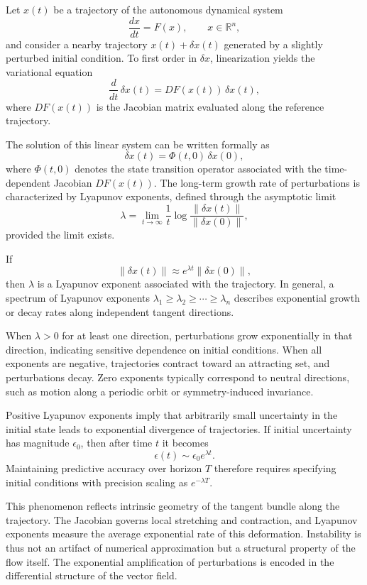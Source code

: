 \documentclass[12pt]{book}
\begin{document}
Let $x(t)$ be a trajectory of the autonomous dynamical system
\[
\frac{dx}{dt} = F(x), 
\qquad x \in \mathbb{R}^n,
\]
and consider a nearby trajectory $x(t) + \delta x(t)$ generated by a slightly perturbed initial condition. To first order in $\delta x$, linearization yields the variational equation
\[
\frac{d}{dt}\,\delta x(t) = DF(x(t))\,\delta x(t),
\]
where $DF(x(t))$ is the Jacobian matrix evaluated along the reference trajectory.

The solution of this linear system can be written formally as
\[
\delta x(t) = \Phi(t,0)\,\delta x(0),
\]
where $\Phi(t,0)$ denotes the state transition operator associated with the time-dependent Jacobian $DF(x(t))$. The long-term growth rate of perturbations is characterized by Lyapunov exponents, defined through the asymptotic limit
\[
\lambda = \lim_{t \to \infty} \frac{1}{t} \log \frac{\|\delta x(t)\|}{\|\delta x(0)\|},
\]
provided the limit exists.

If
\[
\|\delta x(t)\| \approx e^{\lambda t} \|\delta x(0)\|,
\]
then $\lambda$ is a Lyapunov exponent associated with the trajectory. In general, a spectrum of Lyapunov exponents $\lambda_1 \ge \lambda_2 \ge \cdots \ge \lambda_n$ describes exponential growth or decay rates along independent tangent directions.

When $\lambda > 0$ for at least one direction, perturbations grow exponentially in that direction, indicating sensitive dependence on initial conditions. When all exponents are negative, trajectories contract toward an attracting set, and perturbations decay. Zero exponents typically correspond to neutral directions, such as motion along a periodic orbit or symmetry-induced invariance.

Positive Lyapunov exponents imply that arbitrarily small uncertainty in the initial state leads to exponential divergence of trajectories. If initial uncertainty has magnitude $\epsilon_0$, then after time $t$ it becomes
\[
\epsilon(t) \sim \epsilon_0 e^{\lambda t}.
\]
Maintaining predictive accuracy over horizon $T$ therefore requires specifying initial conditions with precision scaling as $e^{-\lambda T}$.

This phenomenon reflects intrinsic geometry of the tangent bundle along the trajectory. The Jacobian governs local stretching and contraction, and Lyapunov exponents measure the average exponential rate of this deformation. Instability is thus not an artifact of numerical approximation but a structural property of the flow itself. The exponential amplification of perturbations is encoded in the differential structure of the vector field.
\end{document}
